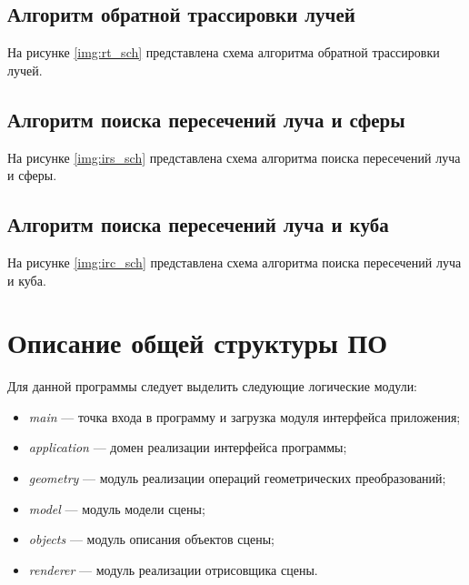 \subsection{Алгоритм обратной трассировки лучей}

На рисунке \ref{img:rt_sch} представлена схема алгоритма обратной трассировки лучей.


\subsection{Алгоритм поиска пересечений луча и сферы}

На рисунке \ref{img:irs_sch} представлена схема алгоритма поиска пересечений луча и сферы.


\subsection{Алгоритм поиска пересечений луча и куба}

На рисунке \ref{img:irc_sch} представлена схема алгоритма поиска пересечений луча и куба.


\section{Описание общей структуры ПО}

Для данной программы следует выделить следующие логические модули: 

\begin{itemize}
	\item \textit{main} --- точка входа в программу и загрузка модуля интерфейса приложения;
	\item \textit{application} --- домен реализации интерфейса программы;
	\item \textit{geometry} --- модуль реализации операций геометрических преобразований;
	\item \textit{model} --- модуль модели сцены;
	\item \textit{objects} --- модуль описания объектов сцены;
	\item \textit{renderer} --- модуль реализации отрисовщика сцены.
\end{itemize}

